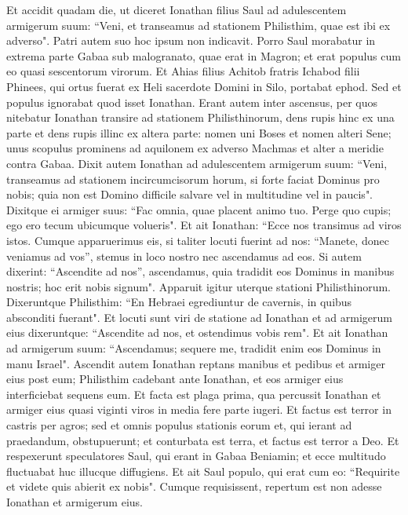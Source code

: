\begin{biblechapter}  
\verse Et accidit quadam die, ut diceret Ionathan filius Saul ad adulescentem armigerum suum: “Veni, et transeamus ad stationem Philisthim, quae est ibi ex adverso". Patri autem suo hoc ipsum non indicavit. 
\verse Porro Saul morabatur in extrema parte Gabaa sub malogranato, quae erat in Magron; et erat populus cum eo quasi sescentorum virorum. 
\verse Et Ahias filius Achitob fratris Ichabod filii Phinees, qui ortus fuerat ex Heli sacerdote Domini in Silo, portabat ephod. Sed et populus ignorabat quod isset Ionathan. 
\verse Erant autem inter ascensus, per quos nitebatur Ionathan transire ad stationem Philisthinorum, dens rupis hinc ex una parte et dens rupis illinc ex altera parte: nomen uni Boses et nomen alteri Sene; 
\verse unus scopulus prominens ad aquilonem ex adverso Machmas et alter a meridie contra Gabaa. 
\verse Dixit autem Ionathan ad adulescentem armigerum suum: “Veni, transeamus ad stationem incircumcisorum horum, si forte faciat Dominus pro nobis; quia non est Domino difficile salvare vel in multitudine vel in paucis". 
\verse Dixitque ei armiger suus: “Fac omnia, quae placent animo tuo. Perge quo cupis; ego ero tecum ubicumque volueris". 
\verse Et ait Ionathan: “Ecce nos transimus ad viros istos. Cumque apparuerimus eis, 
\verse si taliter locuti fuerint ad nos: “Manete, donec veniamus ad vos”, stemus in loco nostro nec ascendamus ad eos. 
\verse Si autem dixerint: “Ascendite ad nos”, ascendamus, quia tradidit eos Dominus in manibus nostris; hoc erit nobis signum". 
\verse Apparuit igitur uterque stationi Philisthinorum. Dixeruntque Philisthim: “En Hebraei egrediuntur de cavernis, in quibus absconditi fuerant". 
\verse Et locuti sunt viri de statione ad Ionathan et ad armigerum eius dixeruntque: “Ascendite ad nos, et ostendimus vobis rem". Et ait Ionathan ad armigerum suum: “Ascendamus; sequere me, tradidit enim eos Dominus in manu Israel". 
\verse Ascendit autem Ionathan reptans manibus et pedibus et armiger eius post eum; Philisthim cadebant ante Ionathan, et eos armiger eius interficiebat sequens eum. 
\verse Et facta est plaga prima, qua percussit Ionathan et armiger eius quasi viginti viros in media fere parte iugeri. 
\verse Et factus est terror in castris per agros; sed et omnis populus stationis eorum et, qui ierant ad praedandum, obstupuerunt; et conturbata est terra, et factus est terror a Deo. 
\verse Et respexerunt speculatores Saul, qui erant in Gabaa Beniamin; et ecce multitudo fluctuabat huc illucque diffugiens. 
\verse Et ait Saul populo, qui erat cum eo: “Requirite et videte quis abierit ex nobis". Cumque requisissent, repertum est non adesse Ionathan et armigerum eius. 

\end{biblechapter}
